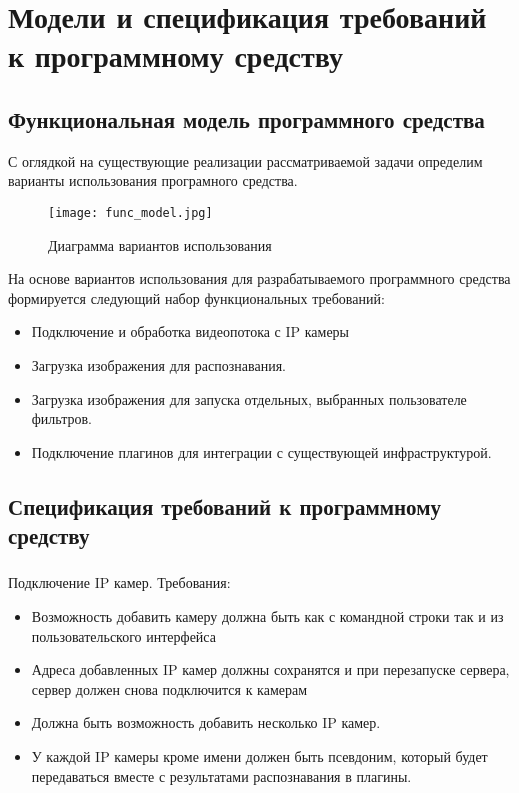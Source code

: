 \section{Модели и спецификация требований к программному средству}
\label{sec:funcreq}

\subsection{Функциональная модель программного средства}
\label{sec:funcreq:funcmodel}

С оглядкой на существующие реализации рассматриваемой задачи определим варианты использования програмного средства.

\begin{figure}[ht]
\centering
    \texttt{[image: func\_model.jpg]}  
    \caption{Диаграмма вариантов использования}
  \label{fig:funcreq:funcmodel}
\end{figure}

На основе вариантов использования для разрабатываемого программного средства формируется следующий набор функциональных требований:
\begin{itemize}
	\item Подключение и обработка видеопотока с IP камеры
	\item Загрузка изображения для распознавания.
	\item Загрузка изображения для запуска отдельных, выбранных пользователе фильтров.
	\item Подключение плагинов для интеграции с существующей инфраструктурой.
\end{itemize}

\subsection{Спецификация требований к программному средству}
\label{sec:fucreq:specification}

\subsubsection{}
Подключение IP камер. Требования:
\begin{itemize}
	\item Возможность добавить камеру должна быть как с командной строки так и из пользовательского интерфейса
	\item Адреса добавленных IP камер должны сохранятся и при перезапуске сервера, сервер должен снова подключится к камерам
	\item Должна быть возможность добавить несколько IP камер.
	\item У каждой IP камеры кроме имени должен быть псевдоним, который будет передаваться вместе с результатами распознавания в плагины. 
\end{itemize}

